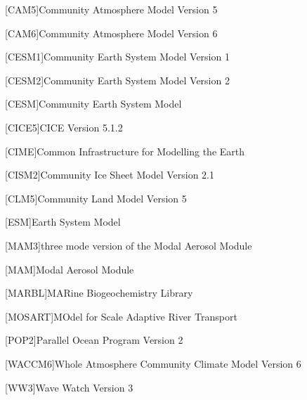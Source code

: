 \documentclass{ametsocV5}
\begin{document}
\begin{acronym}[AODVISstdn]
  [CAM5]{Community Atmosphere Model Version 5}

  [CAM6]{Community Atmosphere Model Version 6}

  [CESM1]{Community Earth System Model Version 1}

  [CESM2]{Community Earth System Model Version 2}

  [CESM]{Community Earth System Model}

  [CICE5]{CICE Version 5.1.2}

  [CIME]{Common Infrastructure for Modelling the Earth}

  [CISM2]{Community Ice Sheet Model Version 2.1}

  [CLM5]{Community Land Model Version 5}

  [ESM]{Earth System Model}

  [MAM3]{three mode version of the Modal Aerosol Module}

  [MAM]{Modal Aerosol Module}

  [MARBL]{MARine Biogeochemistry Library}

  [MOSART]{MOdel for Scale Adaptive River Transport}

  [POP2]{Parallel Ocean Program Version 2}

  [WACCM6]{Whole Atmosphere Community Climate Model Version 6}

  [WW3]{Wave Watch Version 3}

\end{acronym}
\end{document}
